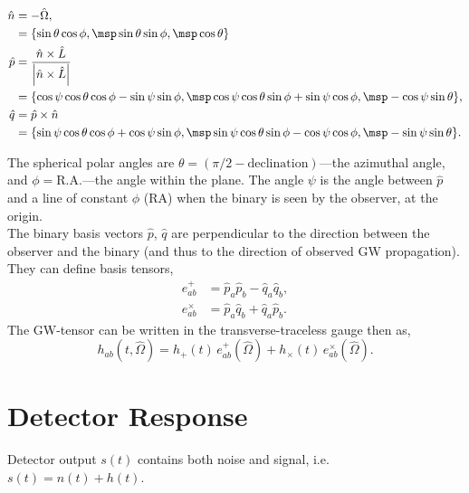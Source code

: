 \documentclass[10pt, oneside, onecolumn]{article}   	%
\begin{document}
    \begin{align}
    \hat{n} & = - \hat{\Omega}, \nonumber \\
    & = \{\sin \theta \cos \phi,\msp  \sin\theta \sin \phi, \msp \cos\theta  \} \nonumber \\
    \hat{p} & = \frac{\hat{n} \times \hat{L}}{\left| \hat{n} \times \hat{L}\right|} \\
    & = \{\cos\psi\cos\theta\cos\phi - \sin\psi\sin\phi , \msp
    \cos\psi\cos\theta\sin\phi + \sin\psi\cos\phi, \msp
    -\cos\psi\sin\theta\}, \nonumber \\
    \hat{q} & = \hat{p} \times \hat{n} \nonumber \\
    & = \{\sin\psi \cos\theta \cos\phi + \cos\psi \sin\phi,
    \msp \sin\psi \cos\theta \sin\phi - \cos\psi \cos\phi,
    \msp -\sin\psi \sin\theta \}. \nonumber
    \end{align}

    The spherical polar angles are $\theta = (\pi/2 - \mathrm{declination})$---the azimuthal angle, and $\phi = \mathrm{R.A.}$---the angle within the plane.  The angle $\psi$ is the angle between $\hat{p}$ and a line of constant $\phi$ (RA) when the binary is seen by the observer, at the origin. \\

    The binary basis vectors $\hat{p}$, $\hat{q}$ are perpendicular to the direction between the observer and the binary (and thus to the direction of observed GW propagation).  They can define basis tensors,
    \begin{align}
    e^{+}_{ab} & = \hat{p}_a \hat{p}_b - \hat{q}_a \hat{q}_b, \nonumber \\
    e^{\times}_{ab} & = \hat{p}_a \hat{q}_b + \hat{q}_a \hat{p}_b.
    \end{align}
    The GW-tensor can be written in the transverse-traceless gauge then as,
    \begin{equation}
    h_{ab}(t, \hat{\Omega}) = h_{+}(t) \, e^{+}_{ab}(\hat{\Omega}) + h_{\times}(t) \, e^{\times}_{ab}(\hat{\Omega}).
    \end{equation}


    \section{Detector Response}
    \label{sec:det_resp}
    Detector output $s(t)$ contains both noise and signal, i.e.~$s(t) = n(t) + h(t)$.
\end{document}
